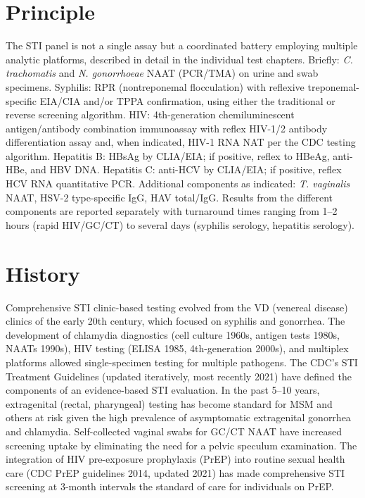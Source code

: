 \section*{Principle}
The STI panel is not a single assay but a coordinated battery employing multiple analytic platforms, described in detail in the individual test chapters. Briefly: \textit{C. trachomatis} and \textit{N. gonorrhoeae} NAAT (PCR/TMA) on urine and swab specimens. Syphilis: RPR (nontreponemal flocculation) with reflexive treponemal-specific EIA/CIA and/or TPPA confirmation, using either the traditional or reverse screening algorithm. HIV: 4th-generation chemiluminescent antigen/antibody combination immunoassay with reflex HIV-1/2 antibody differentiation assay and, when indicated, HIV-1 RNA NAT per the CDC testing algorithm. Hepatitis B: HBsAg by CLIA/EIA; if positive, reflex to HBeAg, anti-HBe, and HBV DNA. Hepatitis C: anti-HCV by CLIA/EIA; if positive, reflex HCV RNA quantitative PCR. Additional components as indicated: \textit{T. vaginalis} NAAT, HSV-2 type-specific IgG, HAV total/IgG. Results from the different components are reported separately with turnaround times ranging from 1--2 hours (rapid HIV/GC/CT) to several days (syphilis serology, hepatitis serology).

\section*{History}
Comprehensive STI clinic-based testing evolved from the VD (venereal disease) clinics of the early 20th century, which focused on syphilis and gonorrhea. The development of chlamydia diagnostics (cell culture 1960s, antigen tests 1980s, NAATs 1990s), HIV testing (ELISA 1985, 4th-generation 2000s), and multiplex platforms allowed single-specimen testing for multiple pathogens. The CDC's STI Treatment Guidelines (updated iteratively, most recently 2021) have defined the components of an evidence-based STI evaluation. In the past 5--10 years, extragenital (rectal, pharyngeal) testing has become standard for MSM and others at risk given the high prevalence of asymptomatic extragenital gonorrhea and chlamydia. Self-collected vaginal swabs for GC/CT NAAT have increased screening uptake by eliminating the need for a pelvic speculum examination. The integration of HIV pre-exposure prophylaxis (PrEP) into routine sexual health care (CDC PrEP guidelines 2014, updated 2021) has made comprehensive STI screening at 3-month intervals the standard of care for individuals on PrEP.

